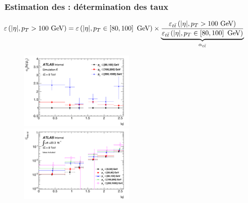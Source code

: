 \begin{frame}
\frametitle{Estimation des  : détermination des taux}
\begin{small}
\[
\hspace*{-0.5cm}
\varepsilon\left(|\eta|,p_T>100~\text{GeV}\right)=\varepsilon\left(|\eta|,p_T\in\left[80,100\right]~\text{GeV}\right)\times\underbrace{\frac{\varepsilon_{t\bar{t}}\left(|\eta|,p_T>100~\text{GeV}\right)}{\varepsilon_{t\bar{t}}\left(|\eta|,p_T\in\left[80,100\right]~\text{GeV}\right)}}_{\alpha_{t\bar{t}}}\]
\end{small}

\begin{figure}[!htb]
\begin{center}
\includegraphics[width=0.5\textwidth]{Figures/QMisId/alpha.pdf}
\includegraphics[width=0.5\textwidth]{Figures/QMisId/Rates2DwithFakes.pdf}
\end{center}
\end{figure}

\end{frame}

